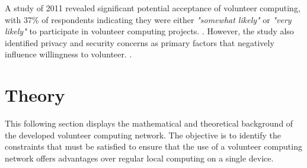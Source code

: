 A study of 2011 revealed significant potential acceptance of volunteer computing, with 37\% of respondents indicating they were either \emph{"somewhat likely"} or \emph{"very likely"} to participate in volunteer computing projects. \cite{intro:volunteerStudy}. However, the study also identified privacy and security concerns as primary factors that negatively influence willingness to volunteer. \cite{intro:volunteerStudy}.

\section{Theory}
\label{sec:background:theory}
This following section displays the mathematical and theoretical background of the developed volunteer computing network. The objective is to identify the constraints that must be satisfied to ensure that the use of a volunteer computing network offers advantages over regular local computing on a single device.

